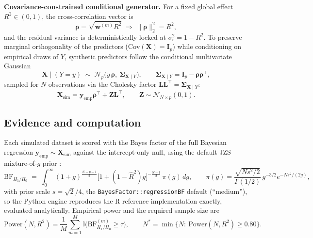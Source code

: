 \documentclass[11pt,a4paper]{article}
\newcommand{\BF}{\mathrm{BF}}
\begin{document}
\textbf{Covariance-constrained conditional generator.} For a fixed global effect $R^2\in(0,1)$, the cross-correlation vector is
\begin{equation}
\bm\rho=\sqrt{\mathbf{w}^{(m)}R^2}\;\Longrightarrow\;\lVert\bm\rho\rVert_2^{2}=R^2 ,
\end{equation}
and the residual variance is deterministically locked at $\sigma_\varepsilon^{2}=1-R^{2}$. To preserve marginal orthogonality of the predictors ($\mathrm{Cov}(\mathbf{X})=\mathbf{I}_p$) while conditioning on empirical draws of $Y$, synthetic predictors follow the conditional multivariate Gaussian
\begin{equation}
\mathbf{X}\mid (Y=y)\;\sim\;\mathcal{N}_p\!\bigl(y\,\bm\rho,\ \bm\Sigma_{\mathbf{X}\mid Y}\bigr),
\qquad
\bm\Sigma_{\mathbf{X}\mid Y}=\mathbf{I}_p-\bm\rho\bm\rho^{\top},
\end{equation}
sampled for $N$ observations via the Cholesky factor $\mathbf{L}\mathbf{L}^{\top}=\bm\Sigma_{\mathbf{X}\mid Y}$:
\begin{equation}
\mathbf{X}_{\mathrm{sim}}=\mathbf{y}_{\mathrm{emp}}\bm\rho^{\top}+\mathbf{Z}\mathbf{L}^{\top},
\qquad \mathbf{Z}\sim\mathcal{N}_{N\times p}(0,1).
\end{equation}

\subsection{Evidence and computation}

Each simulated dataset is scored with the Bayes factor of the full Bayesian regression $\mathbf{y}_{\mathrm{emp}}\sim\mathbf{X}_{\mathrm{sim}}$ against the intercept-only null, using the default JZS mixture-of-$g$ prior \cite{liang2008,rouder2012}:
\begin{equation}
\BF_{H_1/H_0}\;=\;\int_0^{\infty}(1+g)^{\frac{N-p-1}{2}}\bigl[1+(1-\hat R^{2})g\bigr]^{-\frac{N-1}{2}}\,\pi(g)\,dg,
\qquad
\pi(g)=\frac{\sqrt{Ns^{2}/2}}{\Gamma(1/2)}\,g^{-3/2}e^{-Ns^{2}/(2g)},
\label{eq:bfreg}
\end{equation}
with prior scale $s=\sqrt{2}/4$, the \texttt{BayesFactor::regressionBF} default (``medium''), so the Python engine reproduces the R reference implementation exactly, evaluated analytically. Empirical power and the required sample size are
\begin{equation}
\mathrm{Power}(N,R^{2})=\frac{1}{M}\sum_{m=1}^{M}\mathbb{I}\bigl(\BF_{H_1/H_0}^{(m)}\ge\tau\bigr),
\qquad
N^{*}=\min\{N:\ \mathrm{Power}(N,R^{2})\ge0.80\}.
\end{equation}
\end{document}
